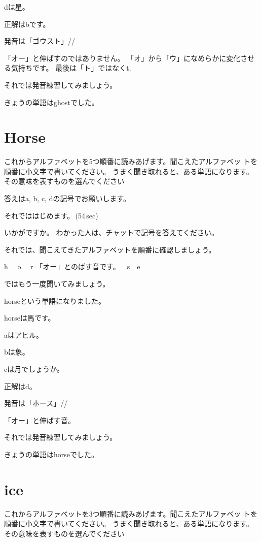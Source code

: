\documentclass[12pt]{jlreq}
\let\textipa\undefined
\newcommand{\myMouse}{%
  {\large \ComputerMouse}
}
\begin{document}
dは星。

正解はbです。


発音は「ゴウスト」/\textipa{g\'oUst}/

「オー」と伸ばすのではありません。
「オ」から「ウ」になめらかに変化させる気持ちです。
最後は「ト」ではなくt.

それでは発音練習してみましょう。

きょうの単語はghostでした。
\newpage
\section{Horse}

これからアルファベットを5つ順番に読みあげます。聞こえたアルファベッ
トを順番に小文字で書いてください。
うまく聞き取れると、ある単語になります。
その意味を表すものを選んでください

答えはa, b, c, dの記号でお願いします。

それでははじめます。\faVolumeUp\,(54\,sec)

いかがですか。
わかった人は、チャットで記号を答えてください。

それでは、聞こえてきたアルファベットを順番に確認しましょう。{\large \ComputerMouse}

h\,\,
{\large \ComputerMouse}\,\,
o\,\,
{\large \ComputerMouse}\,\,
r\,\,「オー」とのばす音です。
{\large \ComputerMouse}\,\,
s
\myMouse\,\,
e

ではもう一度聞いてみましょう。


horseという単語になりました。

horseは馬です。

aはアヒル。

bは象。

cは月でしょうか。

正解はd。



発音は「ホース」/\textipa{h\textopeno\textlengthmark{}{r}s}/

「オー」と伸ばす音。

それでは発音練習してみましょう。

きょうの単語はhorseでした。
\newpage
\section{ice}

これからアルファベットを3つ順番に読みあげます。聞こえたアルファベッ
トを順番に小文字で書いてください。
うまく聞き取れると、ある単語になります。
その意味を表すものを選んでください
\end{document}
